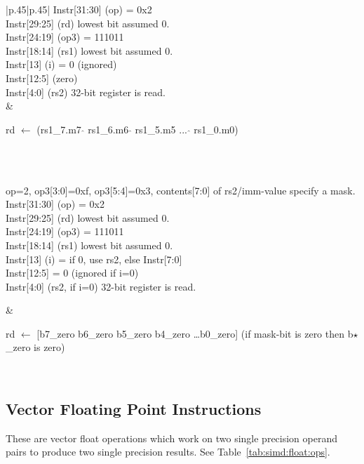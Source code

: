\documentclass{book}
\begin{document}
\begin{table}[p]
\begin{tabular}[p]{|p{.45\textwidth}|p{.45\textwidth}|}
{    Instr[31:30] (op) = 0x2\\
    Instr[29:25] (rd)    lowest bit assumed 0.\\
    Instr[24:19] (op3) = 111011\\
    Instr[18:14] (rs1)   lowest bit assumed 0.\\
    Instr[13]    (i)  = 0 (ignored)\\
    Instr[12:5]   (zero)\\
    Instr[4:0]   (rs2)   32-bit register is read.\\
} & 
 \parbox{\linewidth}{rd $\leftarrow$ (rs1\_7.m7 $\hat{}$ rs1\_6.m6 $\hat{}$ rs1\_5.m5 ... $\hat{}$ rs1\_0.m0)}\\
\hline
\hline
{} \\ 
 \hline 
 \parbox{\linewidth}{op=2, op3[3:0]=0xf, op3[5:4]=0x3, contents[7:0]
    of rs2/imm-value specify a mask.\\

    Instr[31:30] (op) = 0x2\\
    Instr[29:25] (rd)    lowest bit assumed 0.\\
    Instr[24:19] (op3) = 111011\\
    Instr[18:14] (rs1)   lowest bit assumed 0.\\
    Instr[13]    (i)  =  if 0, use rs2, else Instr[7:0]\\
    Instr[12:5]  = 0  (ignored if i=0)\\
    Instr[4:0]   (rs2, if i=0) 32-bit register is read.\\
} & 
 \parbox{\linewidth}{rd $\leftarrow$ [b7\_zero b6\_zero b5\_zero b4\_zero \ldots b0\_zero] (if mask-bit is zero then b$\star$\_zero is zero)}\\
\hline
  \end{tabular}
  \caption{SIMD Instructions II}
  \label{tab:simd:2:insns}
\end{table}

\subsection{Vector Floating Point Instructions}
\label{sec:vector-floating-point-instructions}

These are vector  float operations which work on  two single precision
operand  pairs   to  produce   two  single  precision   results.   See
Table~\ref{tab:simd:float:ops}.
\end{document}
